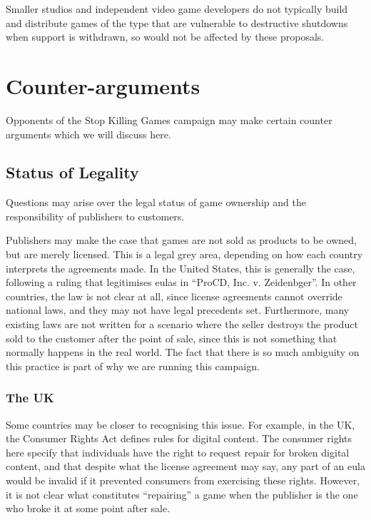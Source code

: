 Smaller studios and independent video game developers do not typically build and distribute games of the type that are vulnerable to destructive shutdowns when support is withdrawn,
so would not be affected by these proposals.


\section{Counter-arguments}
Opponents of the Stop Killing Games campaign may make certain counter arguments which we will discuss here.

\subsection{Status of Legality}
Questions may arise over the legal status of game ownership and the responsibility of publishers to customers.

Publishers may make the case that games are not sold as products to be owned, but are merely licensed.
This is a legal grey area, depending on how each country interprets the agreements made.
In the United States, this is generally the case, following a ruling that legitimises \glspl{eula} in ``ProCD, Inc. v. Zeidenbger''\cite{procd-zeidenberg-1996}.
In other countries, the law is not clear at all, since license agreements cannot override national laws, and they may not have legal precedents set.
Furthermore, many existing laws are not written for a scenario where the seller destroys the product sold to the customer after the point of sale,
since this is not something that normally happens in the real world.
The fact that there is so much ambiguity on this practice is part of why we are running this campaign.

\subsubsection{The UK}
Some countries may be closer to recognising this issue.
For example, in the UK, the Consumer Rights Act defines rules for digital content\cite{cra-digital-2015}.
The consumer rights here specify that individuals have the right to request repair for broken digital content,
and that despite what the license agreement may say, any part of an \gls{eula} would be invalid if it prevented consumers from exercising these rights.
However, it is not clear what constitutes ``repairing'' a game when the publisher is the one who broke it at some point after sale.


